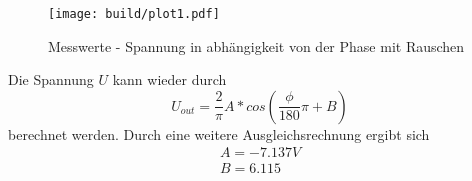 \begin{figure}[H]
    \centering
    \texttt{[image: build/plot1.pdf]}
    \caption{Messwerte - Spannung in abhängigkeit von der Phase mit Rauschen}        
    \label{fig:plot2}
\end{figure}
Die Spannung $U$ kann wieder durch 
\begin{equation*}
    U_{out} = \frac{2}{\pi} A*cos(\frac{\phi}{180}\pi+B)
\end{equation*}
berechnet werden.
Durch eine weitere Ausgleichsrechnung ergibt sich
\begin{align*}
    A=  -7.137 V\\
    B=  6.115
\end{align*}

